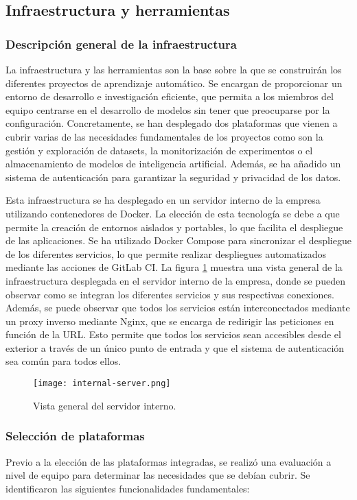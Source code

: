 \subsection{Infraestructura y herramientas}
\subsubsection{Descripción general de la infraestructura}
La infraestructura y las herramientas son la base sobre la que se construirán
los diferentes proyectos de aprendizaje automático. Se encargan de proporcionar
un entorno de desarrollo e investigación eficiente, que permita a los miembros
del equipo centrarse en el desarrollo de modelos sin tener que preocuparse por
la configuración. Concretamente, se han desplegado dos plataformas 
que vienen a cubrir varias de las necesidades fundamentales de los proyectos
como son la gestión y exploración de datasets, la monitorización de experimentos o
el almacenamiento de modelos de inteligencia artificial. Además, se ha añadido un sistema de autenticación 
para garantizar la seguridad y privacidad de los datos.\medskip

Esta infraestructura se ha desplegado en un servidor interno de la empresa
utilizando contenedores de Docker. La elección de esta tecnología se debe a
que permite la creación de entornos aislados y portables, lo que facilita el
despliegue de las aplicaciones. Se ha utilizado Docker Compose para
sincronizar el despliegue de los diferentes servicios, lo que permite
realizar despliegues automatizados mediante las acciones de GitLab CI. La
figura \ref{fig:internal-server} muestra una vista general de la infraestructura
desplegada en el servidor interno de la empresa, donde se pueden observar
como se integran los diferentes servicios y sus respectivas conexiones. Además,
se puede observar que todos los servicios están interconectados mediante un
proxy inverso mediante Nginx, que se encarga de redirigir las peticiones en 
función de la URL. Esto permite que todos los servicios sean
accesibles desde el exterior a través de un único punto de entrada y que el
sistema de autenticación sea común para todos ellos.

\begin{figure}[ht]
    \centering
    \texttt{[image: internal-server.png]}
    \caption{Vista general del servidor interno.}\label{fig:internal-server}
\end{figure}

\subsubsection{Selección de plataformas}
Previo a la elección de las plataformas integradas, se realizó una evaluación
a nivel de equipo para determinar las necesidades que se debían cubrir. Se
identificaron las siguientes funcionalidades fundamentales:

